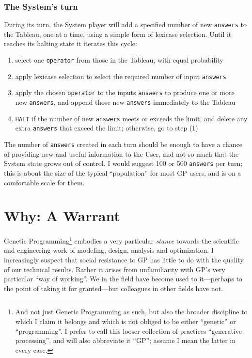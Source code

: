 \subsubsection{The System's turn}\hypertarget{the-systems-turn}{}\label{the-systems-turn}

During its turn, the System player will add a specified number of new \texttt{answers} to the Tableau, one at a time, using a simple form of lexicase selection. Until it reaches its halting state it iterates this cycle:

\begin{enumerate}
\item select one \texttt{operator} from those in the Tableau, with equal probability
\item apply lexicase selection to select the required number of input \texttt{answers}
\item apply the chosen \texttt{operator} to the inputs \texttt{answers} to produce one or more new \texttt{answers}, and append those new \texttt{answers} immediately to the Tableau
\item \texttt{HALT} if the number of new \texttt{answers} meets or exceeds the limit, and delete any extra \texttt{answers} that exceed the limit; otherwise, go to step (1)
\end{enumerate}

The number of \texttt{answers} created in each turn should be enough to have a chance of providing new and useful information to the User, and not so much that the System state grows out of control. I would suggest 100 or 500 \texttt{answers} per turn; this is about the size of the typical ``population'' for most GP users, and is on a comfortable scale for them.

\section{Why: A Warrant}\hypertarget{why-a-warrant}{}\label{why-a-warrant}

Genetic Programming\footnote{And not just Genetic Programming as such, but also the broader discipline to which I claim it belongs and which is not obliged to be either ``genetic'' or ``programming''. I prefer to call this looser collection of practices ``generative processing'', and will also abbreviate it ``GP''; assume I mean the latter in every case.} embodies a very particular \emph{stance} towards the scientific and engineering work of modeling, design, analysis and optimization. I increasingly suspect that social resistance to GP has little to do with the quality of our technical results. Rather it arises from unfamiliarity with GP's very particular ``way of working''. We in the field have become used to it---perhaps to the point of taking it for granted---but colleagues in other fields have not.

